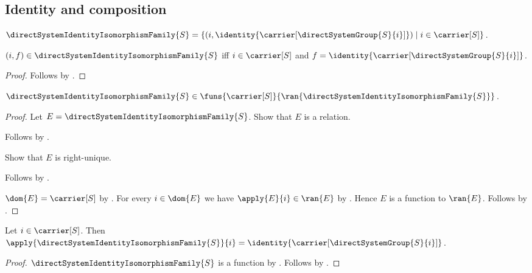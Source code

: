 \subsection{Identity and composition}

\begin{definition}\label{direct_system_identity_isomorphism_family}
    $\directSystemIdentityIsomorphismFamily{S}=
        \{(i,\identity{\carrier[\directSystemGroup{S}{i}]})
            \mid i\in\carrier[S]\}$.
\end{definition}

\begin{proposition}\label{direct_system_identity_isomorphism_family_iff}
    $(i,f)\in\directSystemIdentityIsomorphismFamily{S}$ iff
        $i\in\carrier[S]$ and
        $f=\identity{\carrier[\directSystemGroup{S}{i}]}$.
\end{proposition}
\begin{proof}
    Follows by
        .
\end{proof}

\begin{proposition}\label{direct_system_identity_isomorphism_family_type}
    $\directSystemIdentityIsomorphismFamily{S}\in
        \funs{\carrier[S]}
            {\ran{\directSystemIdentityIsomorphismFamily{S}}}$.
\end{proposition}
\begin{proof}
    Let $E=\directSystemIdentityIsomorphismFamily{S}$.
    Show that $E$ is a relation.
    \begin{subproof}
        Follows by
            .
    \end{subproof}
    Show that $E$ is right-unique.
    \begin{subproof}
        Follows by
            .
    \end{subproof}
    $\dom{E}=\carrier[S]$ by
        .
    For every $i\in\dom{E}$ we have $\apply{E}{i}\in\ran{E}$ by
        .
    Hence $E$ is a function to $\ran{E}$.
    Follows by .
\end{proof}

\begin{proposition}\label{direct_system_identity_isomorphism_family_apply}
    Let $i\in\carrier[S]$.
    Then $\apply{\directSystemIdentityIsomorphismFamily{S}}{i}
        =\identity{\carrier[\directSystemGroup{S}{i}]}$.
\end{proposition}
\begin{proof}
    $\directSystemIdentityIsomorphismFamily{S}$ is a function by
        .
    Follows by
        .
\end{proof}

